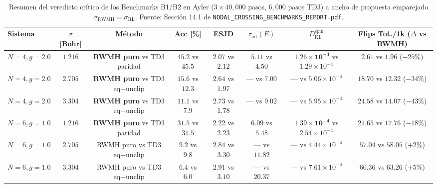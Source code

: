 \documentclass[10pt,a4paper]{article}
\begin{document}
\begin{table}[H]
\centering
\caption{Resumen del veredicto crítico de los Benchmarks B1/B2 en Ayler ($3\times 40{,}000$ pasos, $6{,}000$ pasos TD3) a ancho de propuesta emparejado $\sigma_{\mathrm{RWMH}} = \sigma_{\mathrm{RL}}$. Fuente: Sección 14.1 de \texttt{NODAL\_CROSSING\_BENCHMARKS\_REPORT.pdf}.}
\label{tab:b1b2_verdict}
\begin{adjustbox}{max width=\textwidth}
\begin{tabular}{lccccccc}
\toprule
\textbf{Sistema} & $\sigma$ \textbf{[Bohr]} & \textbf{Método} & \textbf{Acc [\%]} & \textbf{ESJD} & $\tau_{\mathrm{int}}(E)$ & $D_{\mathrm{KL}}^{\mathrm{spin}}$ & \textbf{Flips Tot./1k ($\Delta$ vs RWMH)} \\
\midrule
$N=4, g=2.0$ & $1.216$ & \textbf{RWMH puro} vs TD3 paridad & $45.2$ vs $45.5$ & $2.07$ vs $2.12$ & $5.11$ vs $4.50$ & $\mathbf{1.26\times 10^{-4}}$ vs $1.29\times 10^{-4}$ & $\mathbf{2.61}$ vs $1.96$ (\textbf{$-25\%$}) \\
$N=4, g=2.0$ & $2.705$ & \textbf{RWMH puro} vs TD3 eq+unclip & $\mathbf{15.6}$ vs $12.3$ & $\mathbf{2.64}$ vs $1.97$ & — vs $7.00$ & — vs $5.06\times 10^{-4}$ & $\mathbf{18.70}$ vs $12.32$ (\textbf{$-34\%$}) \\
$N=4, g=2.0$ & $3.304$ & \textbf{RWMH puro} vs TD3 eq+unclip & $\mathbf{11.1}$ vs $7.9$ & $\mathbf{2.73}$ vs $1.78$ & — vs $9.02$ & — vs $5.95\times 10^{-4}$ & $\mathbf{24.58}$ vs $14.07$ (\textbf{$-43\%$}) \\
\midrule
$N=6, g=1.0$ & $1.216$ & \textbf{RWMH puro} vs TD3 paridad & $31.5$ vs $31.5$ & $2.22$ vs $2.23$ & $6.09$ vs $5.48$ & $\mathbf{1.39\times 10^{-4}}$ vs $2.54\times 10^{-4}$ & $\mathbf{21.65}$ vs $17.76$ (\textbf{$-18\%$}) \\
$N=6, g=1.0$ & $2.705$ & RWMH puro vs TD3 eq+unclip & $9.2$ vs $9.8$ & $2.84$ vs $3.30$ & — vs $11.82$ & — vs $4.44\times 10^{-4}$ & $57.04$ vs $58.05$ ($+2\%$) \\
$N=6, g=1.0$ & $3.304$ & RWMH puro vs TD3 eq+unclip & $6.4$ vs $6.0$ & $2.91$ vs $3.10$ & — vs $20.37$ & — vs $7.61\times 10^{-4}$ & $60.36$ vs $63.26$ ($+5\%$) \\
\bottomrule
\end{tabular}
\end{adjustbox}
\end{table}
\end{document}
